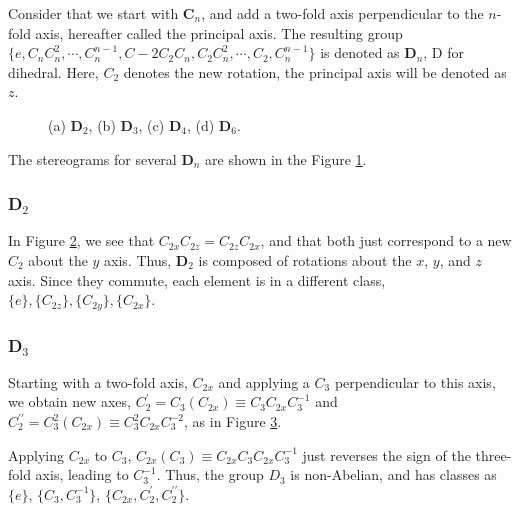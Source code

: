 Consider that we start with {\bf C}$_n$, and add a two-fold axis 
perpendicular to the $n$-fold axis, hereafter called the principal 
axis.  The resulting group $\{e,C_nC_n^2,\cdots , 
C_n^{n-1},C-2C_2C_n,C_2C_n^2,\cdots , C_2, C_n^{n-1}\}$ is denoted as 
{\bf D}$_n$, D for dihedral. Here, $C_2$ denotes the new rotation, 
the principal axis will be denoted as $z$.

\begin{figure}
\caption{(a) {\bf D}$_2$, (b) {\bf D}$_3$, (c) {\bf D}$_4$,
(d) {\bf D}$_6$.}
\label{chap16-fig20}
\end{figure}

The stereograms for several {\bf D}$_n$ are shown in the Figure
\ref{chap16-fig20}.

\subsubsection{D$_2$}

In Figure \ref{chap16-fig21}, we see that $C_{2x}C_{2z} =
C_{2z}C_{2x}$, and that both just correspond to a new $C_2$ about the
$y$ axis.  Thus, {\bf D}$_2$ is composed of rotations about the $x$,
$y$, and $z$ axis.  Since they commute, each element is in a different
class, $\{e\} , \{C_{2z}\}, \{C_{2y}\}, \{C_{2x}\}$.

\begin{figure}
\caption{}
\label{chap16-fig21}
\end{figure}

\subsubsection{D$_3$}

Starting with a two-fold axis, $C_{2x}$ and applying a $C_3$
perpendicular to this axis, we obtain new axes, $C^{\prime}_2 =
C_3(C_{2x}) \equiv C_3C_{2x}C_3^{-1}$ and $C^{\prime \prime}_2 =
C^2_3(C_{2x})\equiv C^2_3C_{2x}C_3^{-2}$, as in Figure
\ref{chap16-fig22}.


\begin{figure}
\caption{}
\label{chap16-fig22}
\end{figure}


Applying $C_{2x}$ to $C_3$, $C_{2x}(C_3) \equiv 
C_{2x}C_3C_{2x}C_3^{-1}$ just reverses the sign of the three-fold 
axis, leading to $C_3^{-1}$.  Thus, the group $D_3$ is non-Abelian, 
and has classes as $\{e\}$, $\{C_3,C_3^{-1}\}$, $\{C_{2x}, C^{\prime}_2, 
C_2^{\prime \prime}\}$.


